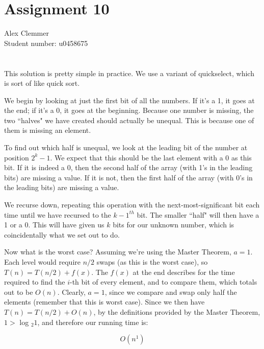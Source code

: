 \documentclass[a4paper]{article}
\begin{document}
\section*{Assignment 10}
Alex Clemmer\\
Student number: u0458675

\section{}

This solution is pretty simple in practice. We use a variant of quickselect, which is sort of like quick sort.

We begin by looking at just the first bit of all the numbers. If it's a 1, it goes at the end; if it's a 0, it goes at the beginning. Because one number is missing, the two ``halves" we have created should actually be unequal. This is because one of them is missing an element.

To find out which half is unequal, we look at the leading bit of the number at position $2^k-1$. We expect that this should be the last element with a 0 as this bit. If it is indeed a 0, then the second half of the array (with 1's in the leading bits) are missing a value. If it is not, then the first half of the array (with 0's in the leading bits) are missing a value.

We recurse down, repeating this operation with the next-most-significant bit each time until we have recursed to the $k-1^{th}$ bit. The smaller ``half" will then have a 1 or a 0. This will have given us $k$ bits for our unknown number, which is coincidentally what we set out to do.

Now what is the worst case? Assuming we're using the Master Theorem, $a = 1$. Each level would require $n/2$ swaps (as this is the worst case), so $T(n) = T(n/2) + f(x)$. The $f(x)$ at the end describes for the time required to find the $i$-th bit of every element, and to compare them, which totals out to be $O(n)$. Clearly, $a = 1$, since we compare and swap only half the elements (remember that this is worst case). Since we then have $T(n) = T(n/2) + O(n)$, by the definitions provided by the Master Theorem, $1 >$ log $_2 1$, and therefore our running time is:

\begin{equation}
O(n^1)
\end{equation}
\end{document}

